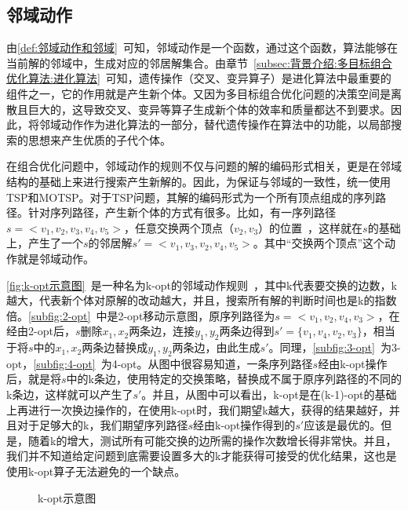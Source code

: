 \subsection{邻域动作}
\label{subsec:背景介绍:局部搜索:邻域动作}
由\autoref{def:邻域动作和邻域}~可知，邻域动作是一个函数，通过这个函数，算法能够在当前解的邻域中，生成对应的邻居解集合。由章节~\ref{subsec:背景介绍:多目标组合优化算法:进化算法}~可知，遗传操作（交叉、变异算子）是进化算法中最重要的组件之一，它的作用就是产生新个体。又因为多目标组合优化问题的决策空间是离散且巨大的，这导致交叉、变异等算子生成新个体的效率和质量都达不到要求。因此，将邻域动作作为进化算法的一部分，替代遗传操作在算法中的功能，以局部搜索的思想来产生优质的子代个体。
\par
在组合优化问题中，邻域动作的规则不仅与问题的解的编码形式相关，更是在邻域结构的基础上来进行搜索产生新解的。因此，为保证与邻域的一致性，统一使用TSP和MOTSP。对于TSP问题，其解的编码形式为一个所有顶点组成的序列路径。针对序列路径，产生新个体的方式有很多。比如，有一序列路径$s = <v_1, v_2, v_3, v_4, v_5>$，任意交换两个顶点（$v_2, v_3$）的位置\cite{borges1998basis}~，这样就在$s$的基础上，产生了一个$s$的邻居解$s' = <v_1, v_3, v_2, v_4, v_5>$。其中“交换两个顶点”这个动作就是邻域动作。
\par
\autoref{fig:k-opt示意图}~是一种名为k-opt的邻域动作规则\cite{helsgaun2006effective}~，其中k代表要交换的边数，k越大，代表新个体对原解的改动越大，并且，搜索所有解的判断时间也是k的指数倍。\autoref{subfig:2-opt}~中是2-opt移动示意图，原序列路径为$s=<v_1, v_2, v_4, v_3>$，在经由2-opt后，$s$删除$x_1, x_2$两条边，连接$y_1, y_2$两条边得到$s'=\{ v_1, v_4, v_2, v_3 \}$，相当于将$s$中的$x_1, x_2$两条边替换成$y_1, y_2$两条边，由此生成$s'$。同理，\autoref{subfig:3-opt}~为3-opt，\autoref{subfig:4-opt}~为4-opt。从图中很容易知道，一条序列路径$s$经由k-opt操作后，就是将$s$中的k条边，使用特定的交换策略，替换成不属于原序列路径的不同的k条边，这样就可以产生了$s'$。并且，从图中可以看出，k-opt是在(k-1)-opt的基础上再进行一次换边操作的，在使用k-opt时，我们期望k越大，获得的结果越好，并且对于足够大的k，我们期望序列路径$s$经由k-opt操作得到的$s'$应该是最优的。但是，随着k的增大，测试所有可能交换的边所需的操作次数增长得非常快。并且，我们并不知道给定问题到底需要设置多大的k才能获得可接受的优化结果，这也是使用k-opt算子无法避免的一个缺点。
\begin{figure}[htb]
    \quad
    \quad
    \caption[k-opt示意图]{k-opt示意图}
    \label{fig:k-opt示意图}
\end{figure}

